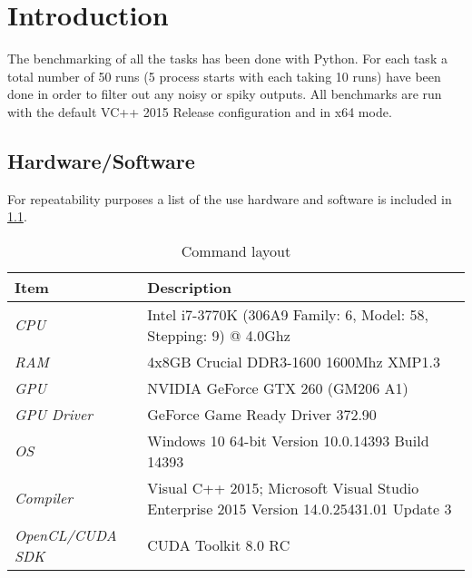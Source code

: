 \documentclass[final]{report}
\begin{document}
\chapter{Introduction}
The benchmarking of all the tasks has been done with Python.
For each task a total number of 50 runs (5 process starts with each taking 10 runs) have been done in order to filter out any noisy or spiky outputs.
All benchmarks are run with the default VC++ 2015 Release configuration and in x64 mode.

\section{Hardware/Software}
For repeatability purposes a list of the use hardware and software is included in \cref{tab:hardware-software}.

\begin{table}[H]
\centering
\caption{Command layout}
\label{tab:hardware-software}
\begin{tabular}{lp{9cm}}
\toprule
\textbf{Item} & \textbf{Description} \\
\midrule
\textit{CPU} & Intel i7-3770K (306A9 Family: 6, Model: 58, Stepping: 9) @ 4.0Ghz\\
\textit{RAM} & 4x8GB Crucial DDR3-1600 1600Mhz XMP1.3\\
\textit{GPU} & NVIDIA GeForce GTX 260 (GM206 A1)\\
\textit{GPU Driver} & GeForce Game Ready Driver 372.90\\
\textit{OS} & Windows 10 64-bit Version 10.0.14393 Build 14393\\
\textit{Compiler} & Visual C++ 2015; Microsoft Visual Studio Enterprise 2015 Version 14.0.25431.01 Update 3\\
\textit{OpenCL/CUDA SDK} & CUDA Toolkit 8.0 RC\\
\bottomrule
\end{tabular}
\end{table}
\end{document}

